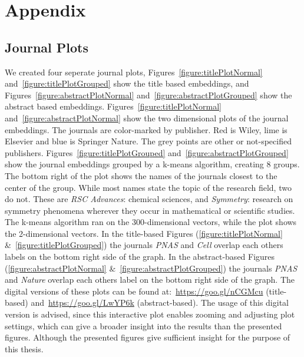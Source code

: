 \documentclass[../../paper.tex]{subfiles}
\begin{document}
\section{Appendix}
\subsection{Journal Plots}
We created four seperate journal plots, Figures~\ref{figure:titlePlotNormal} and~\ref{figure:titlePlotGrouped} show the title based embeddings, and Figures~\ref{figure:abstractPlotNormal} and~\ref{figure:abstractPlotGrouped} show the abstract based embeddings.
Figures~\ref{figure:titlePlotNormal} and~\ref{figure:abstractPlotNormal} show the two dimensional plots of the journal embeddings. The journals are color-marked by publisher. Red is Wiley, lime is Elsevier and blue is Springer Nature. The grey points are other or not-specified publishers.
Figures~\ref{figure:titlePlotGrouped} and~\ref{figure:abstractPlotGrouped} show the journal embeddings grouped by a k-means algorithm, creating 8 groups. The bottom right of the plot shows the names of the journals closest to the center of the group. While most names state the topic of the research field, two do not. These are \textit{RSC Advances}: chemical sciences, and \textit{Symmetry}:  research on symmetry phenomena wherever they occur in mathematical or scientific studies. The k-means algorithm ran on the 300-dimensional vectors, while the plot shows the 2-dimensional vectors. In the title-based Figures (\ref{figure:titlePlotNormal} \&~\ref{figure:titlePlotGrouped}) the journals \textit{PNAS} and \textit{Cell} overlap each others labels on the bottom right side of the graph. In the abstract-based Figures (\ref{figure:abstractPlotNormal} \&~\ref{figure:abstractPlotGrouped}) the journals \textit{PNAS} and \textit{Nature} overlap each others label on the bottom right side of the graph.
The digital versions of these plots can be found at:~\url{https://goo.gl/nCGMcu} (title-based) and~\url{https://goo.gl/LwYP6k} (abstract-based). The usage of this digital version is advised, since this interactive plot enables zooming and adjusting plot settings, which can give a broader insight into the results than the presented figures. Although the presented figures give sufficient insight for the purpose of this thesis.
\end{document}
